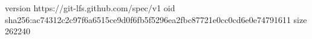 version https://git-lfs.github.com/spec/v1
oid sha256:ac74312c2c97f6a6515ce9d0f6fb5f5296ea2fbc87721e0cc0cd6e0e74791611
size 262240
